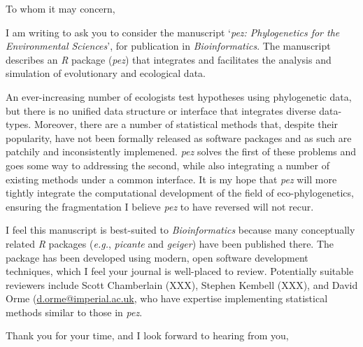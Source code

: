 \documentclass[fontsize=12pt, paper=a4]{scrlttr2}
\begin{document}
\begin{letter}

\opening{To whom it may concern,}\enlargethispage{8\baselineskip}

I am writing to ask you to consider the manuscript `\emph{pez:
  Phylogenetics for the Environmental Sciences}', for publication in
\emph{Bioinformatics}. The manuscript describes an \emph{R} package
(\emph{pez}) that integrates and facilitates the analysis and
simulation of evolutionary and ecological data.

An ever-increasing number of ecologists test hypotheses using
phylogenetic data, but there is no unified data structure or interface
that integrates diverse data-types. Moreover, there are a number of
statistical methods that, despite their popularity, have not been
formally released as software packages and as such are patchily and
inconsistently implemened. \emph{pez} solves the first of these
problems and goes some way to addressing the second, while also
integrating a number of existing methods under a common interface. It
is my hope that \emph{pez} will more tightly integrate the
computational development of the field of eco-phylogenetics, ensuring
the fragmentation I believe \emph{pez} to have reversed will not
recur.

I feel this manuscript is best-suited to \emph{Bioinformatics} because
many conceptually related \emph{R} packages (\emph{e.g.},
\emph{picante} and \emph{geiger}) have been published there. The
package has been developed using modern, open software development
techniques, which I feel your journal is well-placed to
review. Potentially suitable reviewers include Scott Chamberlain
(XXX), Stephen Kembell (XXX), and David Orme
(\url{d.orme@imperial.ac.uk}, who have expertise implementing
statistical methods similar to those in \emph{pez}.

\closing{Thank you for your time, and I look forward to hearing from
  you,\vspace{20pt}}

\end{letter}
\end{document}
